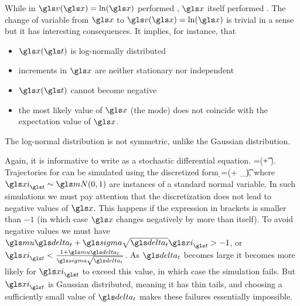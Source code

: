 While in  $\gv(\x)=\ln(\x)$ performed \BM, $\x$ 
itself performed \GBM. The change of variable from $\x$ 
to $\gv(\x)=\ln(\x)$ is trivial in a sense but it has interesting consequences. 
It implies, for instance, that 
\begin{itemize}
\item $\x(\t)$ is log-normally distributed
\item increments in $\x$ are neither stationary nor independent
\item $\x(\t)$ cannot become negative 
\item the most likely value of $\x$ (the mode) does not coincide with the 
expectation value of $\x$. 
\end{itemize}
The log-normal distribution is not symmetric, unlike the Gaussian 
distribution. 

Again, it is informative to write \GBM as a stochastic differential equation. 
\be
\gd\x=\x(\gmu \gd\t+ \gsigma \gd\gW).
\ee
Trajectories for \GBM can be simulated using the discretized form
\be
\d \x=\x(\gmu \dt+ \gsigma \sqrt{\dt} \gxi_\t),
\ee
where $\gxi_\t \sim \mN(0,1)$ are instances of a standard normal variable. In such simulations
we must pay attention that the discretization does not lead to negative values of $\x$. This 
happens if the expression in brackets is smaller than $-1$ (in which case $\x$ changes negatively by more than itself).
To avoid negative values we must have $\gmu \dt + \gsigma \sqrt{\dt} \gxi_\t>-1$, or 
$\gxi_\t <\frac{1+\gmu\dt}{\gsigma \sqrt{\dt}}$. As $\dt$ becomes large it becomes more likely for
$\gxi_\t$ to exceed this value, in which case the simulation fails. But $\gxi_\t$ is Gaussian distributed, meaning
it has thin tails, and choosing a sufficiently small value of $\dt$ makes these failures essentially impossible.

